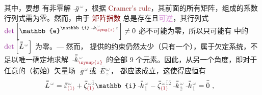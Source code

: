 其中，要想  有非零解 $\Xint{{}^{}_{\mathcolor{gray}{-}}}{10}{\bar{g}}^{\;\!\mathcolor{gray}{\omega}}$，根据 \textcolor{Maroon}{Cramer's rule}，其前面的所有矩阵，组成的系数行列式需为零。然而，由于 \textcolor{Maroon}{矩阵指数} 总是存在且\textcolor{Plum}{可逆}，其行列式 $\textcolor{Plum}{\det} \left[ \mathbb{e}^{\mathbb{i} \Xint{\begin{smallmatrix} ~ \\ {}^{}_{\mathcolor{gray}{-}} \\ ~ \end{smallmatrix}}{15}{\bar{\bar{k}}}_{\textcolor{Maroon}{\symup{z}}}^{\;\! \mathcolor{gray}{\omega}} \mathcolor{gray}{z}} \right] \neq 0$ 必不可能为零，所以只可能有  中的 $\textcolor{Plum}{\det} \left[ \Xint{\mathcolor{gray}{-}}{30}{\bar{\bar{L}}}^{\;\! \mathcolor{gray}{\omega}} \right]$ 为零。--- 然而， 提供的约束仍然太少（只有一个），属于欠定系统，不足以唯一确定地求解 $\Xint{\begin{smallmatrix} ~ \\ {}^{}_{\mathcolor{gray}{-}} \\ ~ \end{smallmatrix}}{15}{\bar{\bar{k}}}_{\textcolor{Maroon}{\symup{z}}}^{\;\! \mathcolor{gray}{\omega}}$ 的全部 9 个元素。因此，从另一个角度，即对于任意的（初始）矢量场 $\Xint{{}^{}_{\mathcolor{gray}{-}}}{10}{\bar{g}}^{\;\!\mathcolor{gray}{\omega}}$或 $\Xint{\mathcolor{gray}{-}}{25}{\bar{E}}^{\;\!\mathcolor{gray}{\omega}}_{\;\! \mathcolor{gray}{z}}$， 都应该成立\cite{sturmElectromagneticWavesCrystals2024}，这使得应恒有
\begin{align} \label{eq:nonlinear(2)-wave_wkrho-simplify6-L4}
	\Xint{\mathcolor{gray}{-}}{32}{\bar{\bar{L}}}^{\;\! \mathcolor{gray}{\omega}}
	= \bar{\bar{\varepsilon}}^{\;\! \mathcolor{gray}{\omega}}_{\textcolor{Maroon}{(1)}} + \bar{\bar{\zeta}}^{\;\! \mathcolor{gray}{\omega} \mathcolor{gray}{\check{1}}}_{\textcolor{Maroon}{(1)}} \mathbb{i} \Xint{\begin{smallmatrix} ~ \\ {}^{}_{\mathcolor{gray}{-}} \\ ~ \end{smallmatrix}}{15}{\bar{\bar{k}}}_{\;\! \mathcolor{gray}{\check{1}}}^{\;\! \mathcolor{gray}{\omega}} - \bar{\bar{\zeta}}^{\;\! \mathcolor{gray}{\omega} \mathcolor{gray}{\check{1} \check{2}}}_{\textcolor{Maroon}{(1)}} \Xint{\begin{smallmatrix} ~ \\ {}^{}_{\mathcolor{gray}{-}} \\ ~ \end{smallmatrix}}{15}{\bar{\bar{k}}}_{\;\! \mathcolor{gray}{\check{2}}}^{\;\! \mathcolor{gray}{\omega}} \Xint{\begin{smallmatrix} ~ \\ {}^{}_{\mathcolor{gray}{-}} \\ ~ \end{smallmatrix}}{15}{\bar{\bar{k}}}_{\;\! \mathcolor{gray}{\check{1}}}^{\;\! \mathcolor{gray}{\omega}} &= \bar{\bar{0}}~,
\end{align}

